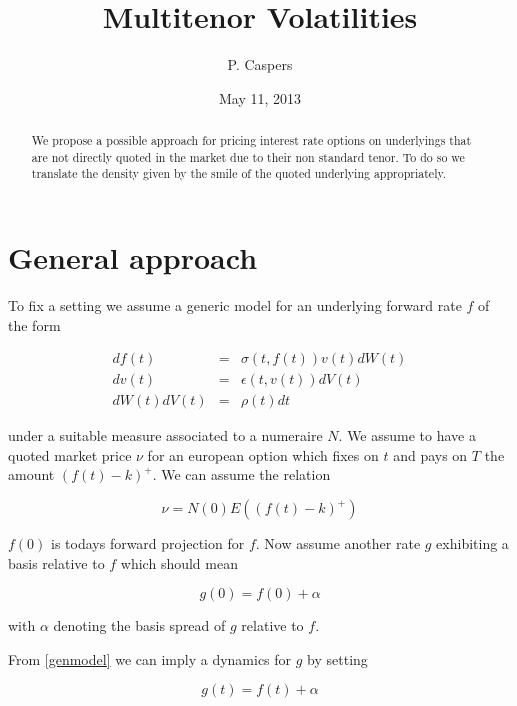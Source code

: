 \documentclass{amsart}
\theoremstyle{plain}
\numberwithin{equation}{section}
\begin{document}

\title[Multitenor Volatilities]{Multitenor Volatilities}
\author{P. Caspers}
\date{May 11, 2013}
\begin{abstract}
We propose  a possible approach for pricing interest rate options on underlyings that are not directly quoted in the market due to their non standard tenor. To do so we translate the density given by the smile of the quoted underlying appropriately. 
\end{abstract}

\maketitle

\section{General approach}
To fix a setting we assume a generic model for an underlying forward rate $f$ of the form

\begin{eqnarray}\label{genmodel}
df(t) &=& \sigma(t,f(t)) v(t) dW(t) \\
dv(t) &=& \epsilon(t,v(t)) dV(t) \\
dW(t) dV(t) &=& \rho(t) dt
\end{eqnarray}

under a suitable measure associated to a numeraire $N$. We assume to have a quoted market price $\nu$ for an european option which fixes on $t$ and pays on $T$ the amount $(f(t)-k)^+$. We can assume the relation

\begin{equation}
\nu = N(0) E( (f(t)-k)^+ )
\end{equation}

$f(0)$ is todays forward projection for $f$. Now assume another rate $g$ exhibiting a basis relative to $f$ which should mean

\begin{equation}
g(0) = f(0) + \alpha
\end{equation}

with $\alpha$ denoting the basis spread of $g$ relative to $f$. 

From \ref{genmodel} we can imply a dynamics for $g$ by setting

\begin{equation}
g(t) = f(t) + \alpha
\end{equation}
\end{document}

